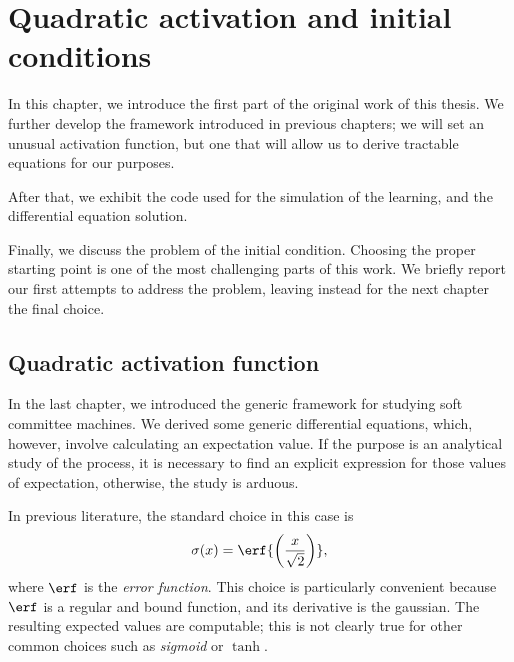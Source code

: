 \chapter{Quadratic activation and initial conditions}
In this chapter, we introduce the first part of the original work of this thesis.
We further develop the framework introduced in previous chapters;
we will set an unusual activation function, but one that will allow us to derive
tractable equations for our purposes.

After that, we exhibit the code used for the simulation of the learning, and the differential
equation solution. 

Finally, we discuss the problem of the initial condition. Choosing the proper starting
point is one of the most challenging parts of this work. We briefly report our first
attempts to address the problem, leaving instead for the next chapter
the final choice.

\section{Quadratic activation function}
In the last chapter, we introduced the generic framework for studying soft committee machines.
We derived some generic differential equations, which, however, involve calculating an expectation value.
If the purpose is an analytical study of the process, it is necessary to find an explicit expression
for those values of expectation, otherwise, the study is arduous.

In previous literature\cite{saad1995line,goldt2019dynamics,veiga2022phase}, the standard choice in this case is
\[\sigma{(x)} = \erf{\left(\frac{x}{\sqrt{2}}\right)},\]
where \(\erf\) is the \emph{error function}. This choice is particularly convenient
because \(\erf\) is a regular and bound function, and its derivative is the gaussian.
The resulting expected values are computable; this is not clearly true for other 
common choices such as \emph{sigmoid} or \(\tanh\).


